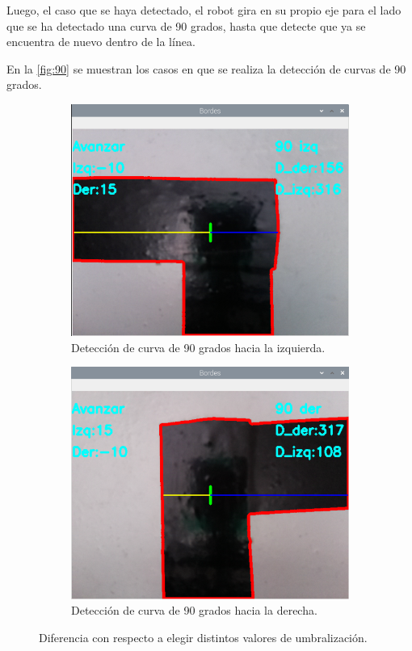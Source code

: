 \documentclass[11pt,a4paper]{article}
\begin{document}
	Luego, el caso que se haya detectado, el robot gira en su propio eje para el lado que se ha detectado una curva de 90 grados, hasta que detecte que ya se encuentra de nuevo dentro de la línea.
	
	En la \autoref*{fig:90} se muestran los casos en que se realiza la detección de curvas de 90 grados.
	
	\begin{figure}[h!]
		\centering
		\begin{subfigure}{0.47\textwidth}
			\includegraphics[width=\textwidth]{imagenes/90_izq.png}
			\caption{Detección de curva de 90 grados hacia la izquierda.}
			\label{fig:90_izq}
		\end{subfigure}
		\hfill
		\begin{subfigure}{0.47\textwidth}
			\includegraphics[width=\textwidth]{imagenes/90_der.png}
			\caption{Detección de curva de 90 grados hacia la derecha.}
			\label{fig:90_der}
		\end{subfigure}
		\caption{Diferencia con respecto a elegir distintos valores de umbralización.}
		\label{fig:90}
	\end{figure}
	
\end{document}
